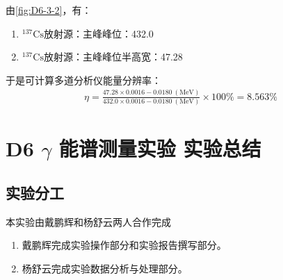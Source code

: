 \documentclass[dvipsnames, svgnames,a4paper,11pt]{article}
\begin{document}
		由\cref{fig:D6-3-2}，有：

		\begin{enumerate}
			\item $^{137}\mathrm{Cs}$放射源：主峰峰位：432.0
			\item $^{137}\mathrm{Cs}$放射源：主峰峰位半高宽：47.28
		\end{enumerate}

		于是可计算多道分析仪能量分辨率：
		\begin{align*}
			\eta = \frac{47.28 \times 0.0016 - 0.0180 \ \mathrm{(MeV)}}{432.0 \times 0.0016 - 0.0180 \ \mathrm{(MeV)}} \times 100 \% = 8.563 \%
		\end{align*}




		

	


	





\clearpage
\section{D6 \quad $\gamma$ 能谱测量实验 \quad\heiti 实验总结}

	\subsection{实验分工}

		本实验由戴鹏辉和杨舒云两人合作完成
		\begin{enumerate}
			\item 戴鹏辉完成实验操作部分和实验报告撰写部分。
			\item 杨舒云完成实验数据分析与处理部分。
		\end{enumerate}
	
\end{document}
